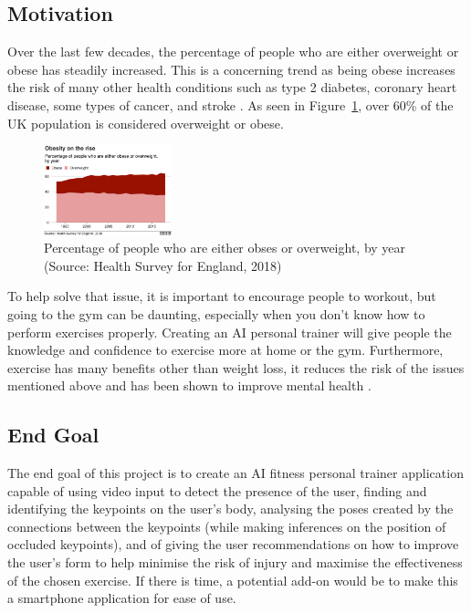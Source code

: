 \documentclass[runningheads]{llncs}
\begin{document}
    \subsection{Motivation}
        Over the last few decades, the percentage of people who are either overweight or obese has steadily increased. This is a concerning trend as being obese increases the risk of many other health conditions such as type 2 diabetes, coronary heart disease, some types of cancer, and stroke \parencite{NHS-obesity}. As seen in Figure~\ref{fig:obesity}, over 60\% of the UK population is considered overweight or obese. \\

        \begin{figure}[htbp]
            \centering
            \includegraphics[width=0.33\textwidth]{figures/obesity.png}
            \caption{Percentage of people who are either obses or overweight, by year (Source: Health Survey for England, 2018)}\label{fig:obesity}
        \end{figure}

        To help solve that issue, it is important to encourage people to workout, but going to the gym can be daunting, especially when you don't know how to perform exercises properly. Creating an AI personal trainer will give people the knowledge and confidence to exercise more at home or the gym. Furthermore, exercise has many benefits other than weight loss, it reduces the risk of the issues mentioned above and has been shown to improve mental health \parencite{NHS-benefits}.

    \subsection{End Goal}
        The end goal of this project is to create an AI fitness personal trainer application capable of using video input to detect the presence of the user, finding and identifying the keypoints on the user's body, analysing the poses created by the connections between the keypoints (while making inferences on the position of occluded keypoints), and of giving the user recommendations on how to improve the user's form to help minimise the risk of injury and maximise the effectiveness of the chosen exercise. If there is time, a potential add-on would be to make this a smartphone application for ease of use.
\end{document}
